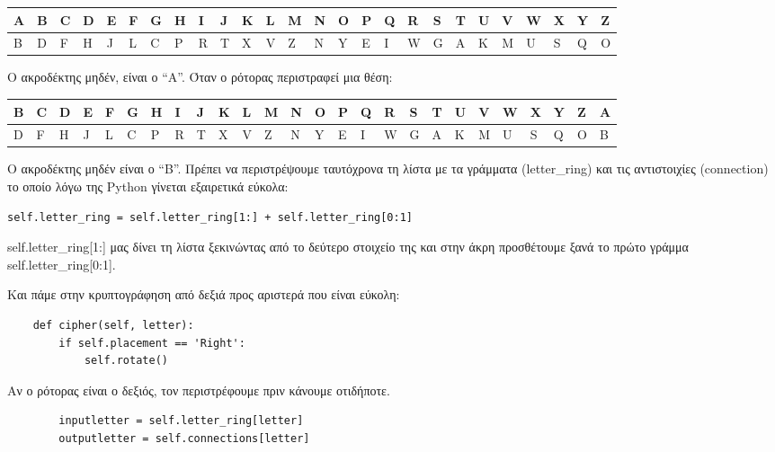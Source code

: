 \documentclass[a4paper,twoside,12pt]{article}
\begin{document}
\begin{center}
\begin{tabularx}{\textwidth}{|*{26}{>{\centering\arraybackslash}X|}}
\hline
A&B&C&D&E&F&G&H&I&J&K&L&M&N&O&P&Q&R&S&T&U&V&W&X&Y&Z\\
\hline
B&D&F&H&J&L&C&P&R&T&X&V&Z&N&Y&E&I&W&G&A&K&M&U&S&Q&O\\
\hline
\end{tabularx}
\end{center}

Ο ακροδέκτης μηδέν, είναι ο “Α”. Όταν ο ρότορας περιστραφεί μια θέση:	

\begin{center}
\begin{tabularx}{\textwidth}{|*{26}{>{\centering\arraybackslash}X|}}
\hline
B&C&D&E&F&G&H&I&J&K&L&M&N&O&P&Q&R&S&T&U&V&W&X&Y&Z&A\\
\hline
D&F&H&J&L&C&P&R&T&X&V&Z&N&Y&E&I&W&G&A&K&M&U&S&Q&O&B\\
\hline
\end{tabularx}
\end{center}

Ο ακροδέκτης μηδέν είναι ο “Β”. Πρέπει να περιστρέψουμε ταυτόχρονα  τη λίστα με τα γράμματα (letter\_ring) και τις αντιστοιχίες (connection) το οποίο λόγω της Python γίνεται εξαιρετικά εύκολα:

\begin{verbatim}
self.letter_ring = self.letter_ring[1:] + self.letter_ring[0:1]
\end{verbatim}

self.letter\_ring[1:] μας δίνει τη λίστα ξεκινώντας από το δεύτερο στοιχείο της και στην άκρη προσθέτουμε ξανά το πρώτο γράμμα self.letter\_ring[0:1].

Και πάμε στην κρυπτογράφηση από δεξιά προς αριστερά που είναι εύκολη:

\begin{verbatim}
    def cipher(self, letter):
        if self.placement == 'Right':
            self.rotate()
\end{verbatim}

Αν ο ρότορας είναι ο δεξιός, τον περιστρέφουμε πριν κάνουμε οτιδήποτε.

\begin{verbatim}
        inputletter = self.letter_ring[letter]
        outputletter = self.connections[letter]
\end{verbatim}
\end{document}

